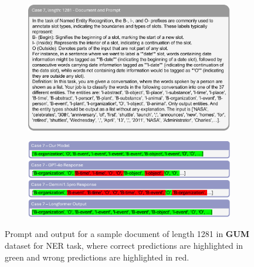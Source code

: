 \documentclass[11pt]{article}
\begin{document}
\begin{figure}[!h]
    \centering
    \begin{subfigure}[b]{1.0\linewidth}   
        \includegraphics[width=\textwidth]{images/case7_prompt.png} %
    \end{subfigure}
    \vspace{1pt}
    \begin{subfigure}[b]{1.0\linewidth}  
        \includegraphics[width=\textwidth]{images/case7_ans.png}
    \end{subfigure}
    \caption{Prompt and output for a sample document of length 1281 in \textbf{GUM} dataset for NER task, where correct predictions are highlighted in green and wrong predictions are highlighted in red.}
    \label{case7}
\end{figure}
\end{document}
